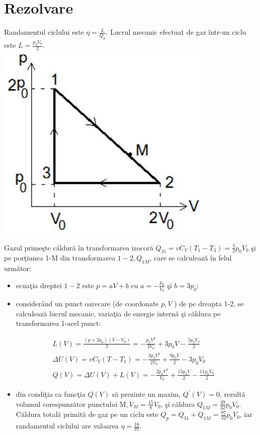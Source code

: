 \section*{Rezolvare}
Randamentul ciclului este $\eta=\frac{L}{Q_{p}}$. Lucrul mecanic efectuat de gaz într-un ciclu este $L=\frac{p_{0} V_{0}}{2}$.\\
\includegraphics[width=0.4\linewidth]{images/2025_08_19_9e83650bd9c853eca85eg-10(1)}

Gazul primeşte căldură în transformarea izocoră $Q_{31}=v C_{V}\left(T_{1}-T_{3}\right)=\frac{3}{2} p_{0} V_{0}$ şi pe porţiunea 1-M din transformarea $1-2, Q_{1 M}$, care se calculează în felul următor:

\begin{itemize}
  \item ecuaţia dreptei $1-2$ este $p=a V+b$ cu $a=-\frac{p_{0}}{V_{0}}$ şi $b=3 p_{0}$;
  \item considerând un punct oarecare (de coordonate $p, V$ ) de pe dreapta 1-2, se calculează lucrul mecanic, variaţia de energie internă şi căldura pe transformarea 1-acel punct:
\end{itemize}

$$
\begin{aligned}
& L(V)=\frac{\left(p+2 p_{0}\right)\left(V-V_{0}\right)}{2}=-\frac{p_{0} V^{2}}{2 V_{0}}+3 p_{0} V-\frac{5 p_{0} V_{0}}{2} \\
& \Delta U(V)=v C_{V}\left(T-T_{1}\right)=-\frac{3 p_{0} V^{2}}{2 V_{0}}+\frac{9 p_{0} V}{2}-3 p_{0} V_{0} \\
& Q(V)=\Delta U(V)+L(V)=-\frac{2 p_{0} V^{2}}{V_{0}}+\frac{15 p_{0} V}{2}-\frac{11 p_{0} V_{0}}{2}
\end{aligned}
$$

\begin{itemize}
  \item din condiţia ca funcţia $Q(V)$ să prezinte un maxim, $Q^{\prime}(V)=0$, rezultă volumul corespunzător punctului $\mathrm{M}, V_{M}=\frac{15}{8} V_{0}$, şi căldura $Q_{1 M}=\frac{49}{32} p_{0} V_{0}$.\\
Căldura totală primită de gaz pe un ciclu este $Q_{p}=Q_{31}+Q_{1 M}=\frac{97}{32} p_{0} V_{0}$, iar randamentul ciclului are valoarea $\eta=\frac{16}{97}$.
\end{itemize}

